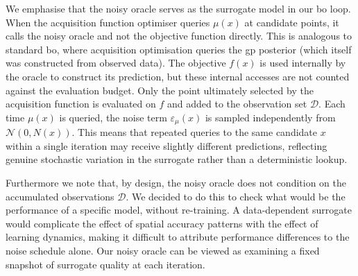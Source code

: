 We emphasise that the noisy oracle serves as the surrogate model in our \gls{bo} loop. When the acquisition function optimiser queries $\mu(x)$ at candidate points, it calls the noisy oracle and not the objective function directly. This is analogous to standard \gls{bo}, where acquisition optimisation queries the \gls{gp} posterior (which itself was constructed from observed data). The objective $f(x)$ is used internally by the oracle to construct its prediction, but these internal accesses are not counted against the evaluation budget. Only the point ultimately selected by the acquisition function is evaluated on $f$ and added to the observation set $\mathcal{D}$. Each time $\mu(x)$ is queried, the noise term $\varepsilon_\mu(x)$ is sampled independently from $\mathcal{N}(0,N(x))$. This means that repeated queries to the same candidate $x$ within a single iteration may receive slightly different predictions, reflecting genuine stochastic variation in the surrogate rather than a deterministic lookup.

Furthermore we note that, by design, the noisy oracle does not condition on the accumulated observations $\mathcal{D}$. We decided to do this to check what would be the performance of a specific model, without re-training. A data-dependent surrogate would complicate the effect of spatial accuracy patterns with the effect of learning dynamics, making it difficult to attribute performance differences to the noise schedule alone. Our noisy oracle can be viewed as examining a fixed snapshot of surrogate quality at each iteration.

